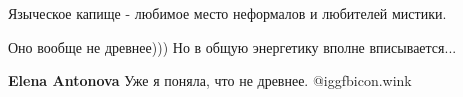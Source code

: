  
 
 
 
 


Языческое капище - любимое место неформалов и любителей мистики.

Оно вообще не древнее))) Но в общую энергетику вполне вписывается...

\textbf{Elena Antonova} Уже я поняла, что не древнее. @igg{fbicon.wink} 
